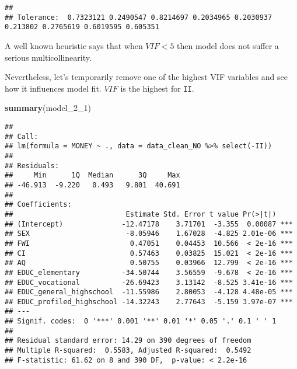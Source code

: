 \documentclass[]{article}
\newenvironment{Shaded}{\begin{snugshade}}{\end{snugshade}}
\newcommand{\DecValTok}[1]{\textcolor[rgb]{0.00,0.00,0.81}{#1}}
\newcommand{\KeywordTok}[1]{\textcolor[rgb]{0.13,0.29,0.53}{\textbf{#1}}}
\newcommand{\NormalTok}[1]{#1}
\newcommand{\OperatorTok}[1]{\textcolor[rgb]{0.81,0.36,0.00}{\textbf{#1}}}
\newcommand{\StringTok}[1]{\textcolor[rgb]{0.31,0.60,0.02}{#1}}
\begin{document}
\begin{verbatim}
## 
## Tolerance:  0.7323121 0.2490547 0.8214697 0.2034965 0.2030937 0.213802 0.2765619 0.6019595 0.605351
\end{verbatim}

A well known heuristic says that when \(VIF < 5\) then model does not
suffer a serious multicollinearity.

Nevertheless, let's temporarily remove one of the highest VIF variables
and see how it influences model fit. \(VIF\) is the highest for
\texttt{II}.

\begin{Shaded}
\end{Shaded}

\begin{Shaded}
\begin{Highlighting}[]
\KeywordTok{summary}\NormalTok{(model_}\DecValTok{2}\NormalTok{_}\DecValTok{1}\NormalTok{)}
\end{Highlighting}
\end{Shaded}

\begin{verbatim}
## 
## Call:
## lm(formula = MONEY ~ ., data = data_clean_NO %>% select(-II))
## 
## Residuals:
##     Min      1Q  Median      3Q     Max 
## -46.913  -9.220   0.493   9.801  40.691 
## 
## Coefficients:
##                           Estimate Std. Error t value Pr(>|t|)    
## (Intercept)              -12.47178    3.71701  -3.355  0.00087 ***
## SEX                       -8.05946    1.67028  -4.825 2.01e-06 ***
## FWI                        0.47051    0.04453  10.566  < 2e-16 ***
## CI                         0.57463    0.03825  15.021  < 2e-16 ***
## AQ                         0.50755    0.03966  12.799  < 2e-16 ***
## EDUC_elementary          -34.50744    3.56559  -9.678  < 2e-16 ***
## EDUC_vocational          -26.69423    3.13142  -8.525 3.41e-16 ***
## EDUC_general_highschool  -11.55986    2.80053  -4.128 4.48e-05 ***
## EDUC_profiled_highschool -14.32243    2.77643  -5.159 3.97e-07 ***
## ---
## Signif. codes:  0 '***' 0.001 '**' 0.01 '*' 0.05 '.' 0.1 ' ' 1
## 
## Residual standard error: 14.29 on 390 degrees of freedom
## Multiple R-squared:  0.5583, Adjusted R-squared:  0.5492 
## F-statistic: 61.62 on 8 and 390 DF,  p-value: < 2.2e-16
\end{verbatim}
\end{document}
